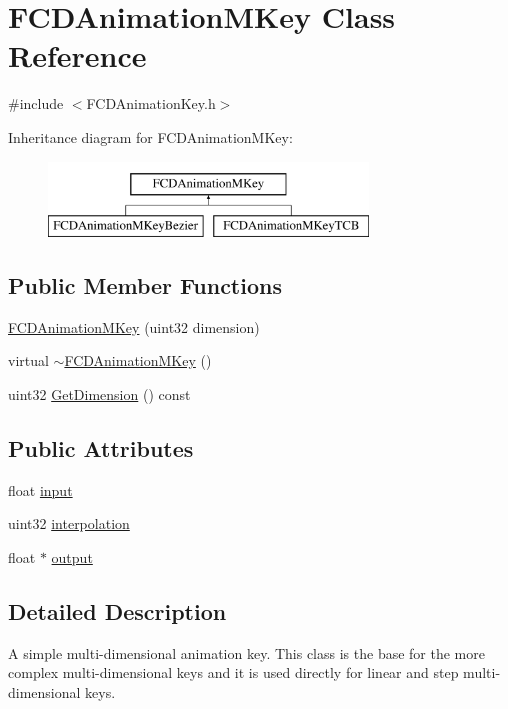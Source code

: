 \hypertarget{classFCDAnimationMKey}{
\section{FCDAnimationMKey Class Reference}
\label{classFCDAnimationMKey}
}


{\ttfamily \#include $<$FCDAnimationKey.h$>$}

Inheritance diagram for FCDAnimationMKey:\begin{figure}[H]
\begin{center}
\leavevmode
\includegraphics[height=2.000000cm]{classFCDAnimationMKey}
\end{center}
\end{figure}
\subsection*{Public Member Functions}
\begin{DoxyCompactItemize}
\item 
\hyperlink{classFCDAnimationMKey_a47f7144948d1042b187492722c2db4ae}{FCDAnimationMKey} (uint32 dimension)
\item 
virtual \hyperlink{classFCDAnimationMKey_aa0372888809476aee77140e315df5141}{$\sim$FCDAnimationMKey} ()
\item 
uint32 \hyperlink{classFCDAnimationMKey_ab1effabe7abcc46821442b88f7c459ba}{GetDimension} () const 
\end{DoxyCompactItemize}
\subsection*{Public Attributes}
\begin{DoxyCompactItemize}
\item 
float \hyperlink{classFCDAnimationMKey_a23e2a29dcce4b317979da21ec48f8e68}{input}
\item 
uint32 \hyperlink{classFCDAnimationMKey_afde626bbddacb9897d80a6158f1a8e2a}{interpolation}
\item 
float $\ast$ \hyperlink{classFCDAnimationMKey_a44bfaf4f29f3946f9a3ffe0db81828cb}{output}
\end{DoxyCompactItemize}


\subsection{Detailed Description}
A simple multi-\/dimensional animation key. This class is the base for the more complex multi-\/dimensional keys and it is used directly for linear and step multi-\/dimensional keys. 

